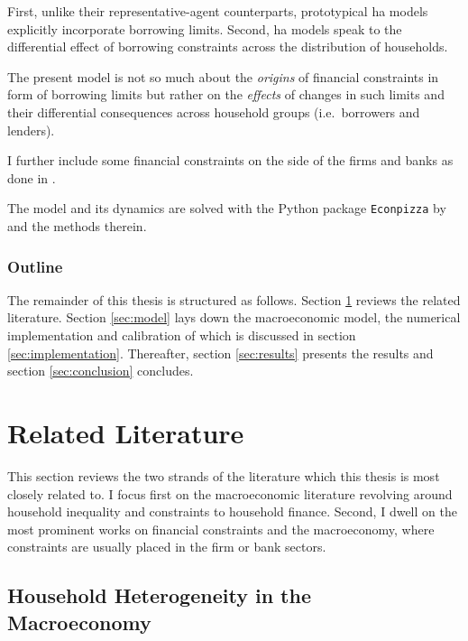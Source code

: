 \documentclass[12pt]{article}
\numberwithin{equation}{section} %
\begin{document}
First, unlike their representative-agent counterparts, prototypical \Gls{ha} models explicitly incorporate borrowing limits. Second, \Gls{ha} models speak to the differential effect of borrowing constraints across the distribution of households.

The present model is not so much about the \textit{origins} of financial constraints in form of borrowing limits but rather on the \textit{effects} of changes in such limits and their differential consequences across household groups (i.e.~borrowers and lenders).

I further include some financial constraints on the side of the firms and banks as done in \textcite{zoch2022}.

The model and its dynamics are solved with the Python package \texttt{Econpizza} by \textcite{boehl2023econpizza} and the methods therein.

\subsubsection*{Outline}
\label{sec:outline}
The remainder of this thesis is structured as follows. Section \ref{sec:literature} reviews the related literature. Section \ref{sec:model} lays down the macroeconomic model, the numerical implementation and calibration of which is discussed in section \ref{sec:implementation}. Thereafter, section \ref{sec:results} presents the results and section \ref{sec:conclusion} concludes.

\section{Related Literature}
\label{sec:literature}

This section reviews the two strands of the literature which this thesis is most closely related to. I focus first on the macroeconomic literature revolving around household inequality and constraints to household finance. Second, I dwell on the most prominent works on financial constraints and the macroeconomy, where constraints are usually placed in the firm or bank sectors.

\subsection{Household Heterogeneity in the Macroeconomy}
\label{sec:literature-hetero}
\end{document}
